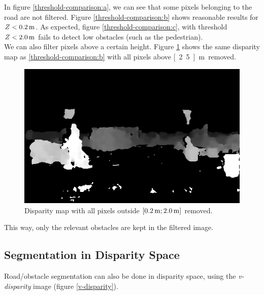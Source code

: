 \documentclass[a4paper,11pt]{article}
\begin{document}
In figure \ref{threshold-comparison:a}, we can see that some pixels belonging to the road are not filtered. Figure \ref{threshold-comparison:b} shows reasonable results for $ Z < \unit[0.2]{m} $. As expected, figure \ref{threshold-comparison:c}, with threshold $ Z < \unit[2.0]{m} $ fails to detect low obstacles (such as the pedestrian).\\
We can also filter pixels above a certain height. Figure \ref{threshold-height} shows the same disparity map as \ref{threshold-comparison:b} with all pixels above \unit[2.5]{m} removed.

\begin{figure}[H]
\centering
\includegraphics[scale=0.5]{pic/cartesian-02-25m.png}
\caption{Disparity map with all pixels outside $\left[\unit[0.2]{m}; \unit[2.0]{m} \right]$ removed.}
\label{threshold-height}
\end{figure}

This way, only the relevant obstacles are kept in the filtered image.


\subsection{Segmentation in Disparity Space}
Road/obstacle segmentation can also be done in disparity space, using the \textit{v-disparity} image (figure \ref{v-disparity}).
\end{document}
